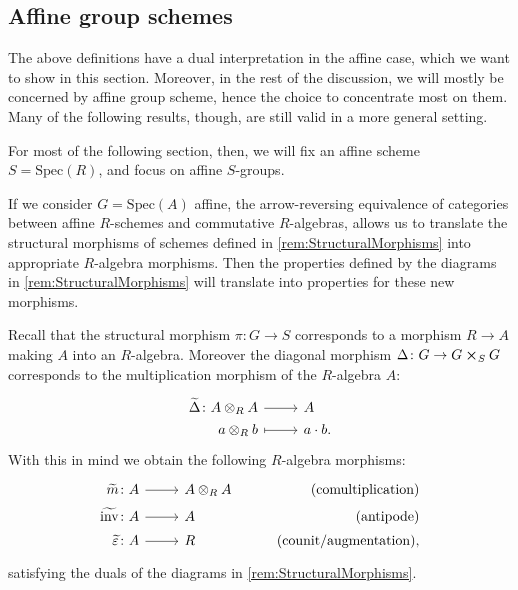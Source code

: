 \subsection{Affine group schemes}
The above definitions have a dual interpretation in the affine case,
which we want to show in this section.
Moreover, in the rest of the discussion, we will mostly be concerned by
affine group scheme, hence the choice to concentrate most on them.
Many of the following results, though, are still valid in a more general setting.

For most of the following section, then, we will fix an affine scheme
$S = \mathrm{Spec}(R)$, and focus on affine $S$-groups.


\begin{rem}[]
If we consider $G = \mathrm{Spec}(A)$ affine, 
the arrow-reversing equivalence of categories between
affine $R$-schemes and commutative $R$-algebras, 
allows us to translate the structural morphisms
of schemes defined in \cref{rem:StructuralMorphisms} into
appropriate $R$-algebra morphisms.
Then the properties defined by the diagrams in \cref{rem:StructuralMorphisms}
will translate into properties for these new morphisms.

Recall that the structural morphism $\pi\colon G \to S$ corresponds to a
morphism $R \to A$ making $A$ into an $R$-algebra.
Moreover the diagonal morphism $\Delta\colon G \to G \cross_{ S } G$ corresponds
to the multiplication morphism of the $R$-algebra $A$:
\begin{equation*}
\begin{tikzcd}[row sep = 0ex
	,/tikz/column 1/.append style={anchor=base east}
	,/tikz/column 2/.append style={anchor=base west}]
	\widetilde{\Delta}\colon A \otimes_R A \arrow[r, "", rightarrow] &
	A \\
	a \otimes_R b \arrow[r, "", mapsto] & a \cdot b
.\end{tikzcd}
\end{equation*} 
With this in mind we obtain the following $R$-algebra morphisms:
\begin{equation*}
		\begin{tikzcd}[row sep = 0ex
 ,/tikz/column 1/.append style={anchor=base east}
 ,/tikz/column 2/.append style={anchor=base west}
 ,/tikz/column 3/.append style={anchor=base east}]
		\widetilde{m}\colon A \arrow[r, "", rightarrow] &
		A \otimes_R A & \text{(comultiplication)} \\
		\widetilde{\mathrm{inv}}\colon A \arrow[r, "", rightarrow] &
		A & \text{(antipode)} \\
		\widetilde{\varepsilon} \colon A \arrow[r, "", rightarrow] &
		R & \text{(counit/augmentation),}
	\end{tikzcd}
\end{equation*} 
satisfying the duals of the diagrams in \cref{rem:StructuralMorphisms}.
\end{rem}


